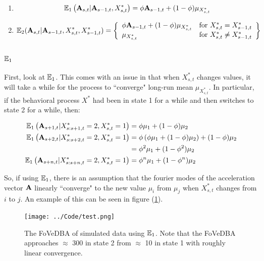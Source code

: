 \begin{enumerate}
	\item $$\mathbb{E}_1\left(\mathbf{A}_{s,t} | \mathbf{A}_{s-1,t}, X^*_{s,t}\right) = \phi \mathbf{A}_{s-1,t} + (1-\phi) \mu_{X^*_{s,t}} $$
	
	\item $$\mathbb{E}_2(\mathbf{A}_{s,t} | \mathbf{A}_{s-1,t}, X^*_{s,t}, X^*_{s-1,t}) = \left\{\begin{array}{lr}
	\phi \mathbf{A}_{s-1,t} + (1-\phi) \mu_{X^*_{s,t}} & \text{for } X^*_{s,t} = X^*_{s-1,t}\\
	\mu_{X^*_{s,t}} & \text{for } X^*_{s,t} \neq X^*_{s-1,t}
	\end{array}\right\}$$
\end{enumerate}

\subsubsection{$\mathbb{E}_1$}

First, look at $\mathbb{E}_1$. This comes with an issue in that when $X^*_{s,t}$ changes values, it will take a while for the process to ``converge" long-run mean $\mu_{X^*_{s,t}}$. In particular, if the behavioral process $X^*$ had been in state 1 for a while and then switches to state 2 for a while, then:

\begin{align*}
	\mathbb{E}_1\left(\mathbf{A}_{s+1,t}|X^*_{s:s+1,t} = 2, X^*_{s,t} = 1\right) &=  \phi \mu_1 + (1-\phi) \mu_2 \\
	\mathbb{E}_1\left(\mathbf{A}_{s+2,t}|X^*_{s:s+2,t} = 2, X^*_{s,t} = 1\right) &= \phi\left( \phi \mu_1 + (1-\phi) \mu_2\right) + (1-\phi)\mu_2 \\
	&= \phi^2 \mu_1 + (1-\phi^2) \mu_2\\
	\mathbb{E}_1\left(\mathbf{A}_{s+n,t}|X^*_{s:s+n,t} = 2, X^*_{s,t} = 1\right) &=  \phi^n \mu_1 + (1-\phi^n) \mu_2 \\
\end{align*}

So, if using $\mathbb{E}_1$, there is an assumption that the fourier modes of the acceleration vector $\mathbf{A}$ linearly ``converge" to the new value $\mu_i$ from $\mu_j$ when $X^*_{s,t}$ changes from $i$ to $j$. An example of this can be seen in figure (\ref{fig:FOVEDBA}).

 \begin{figure}[h!]
 	\centering
 	\texttt{[image: ../Code/test.png]}
 	\caption{The FoVeDBA of simulated data using $\mathbb{E}_1$. Note that the FoVeDBA approaches $\approx$ 300 in state 2 from $\approx$ 10 in state 1 with roughly linear convergence.}
 	\label{fig:FOVEDBA}
 \end{figure}
 
